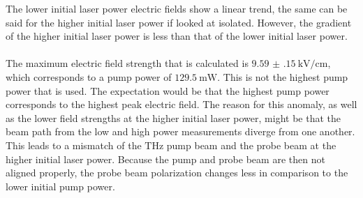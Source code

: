 The lower initial laser power electric fields show a linear trend, the same can be said for the higher initial laser power if looked at isolated.
However, the gradient of the higher initial laser power is less than that of the lower initial laser power.
\\\\
The maximum electric field strength that is calculated is $\SI{9.59(15)}{\kilo\V\per\centi\meter}$, which corresponds to a pump power of $\SI{129.5}{\milli\W}$.
This is not the highest pump power that is used.
The expectation would be that the highest pump power corresponds to the highest peak electric field.
The reason for this anomaly, as well as the lower field strengths at the higher initial laser power, might be that the beam path from the low and high power measurements diverge from one another.
This leads to a mismatch of the $\si{\tera\hertz}$ pump beam and the probe beam at the higher initial laser power.
Because the pump and probe beam are then not aligned properly, the probe beam polarization changes less in comparison to the lower initial pump power.

\FloatBarrier
